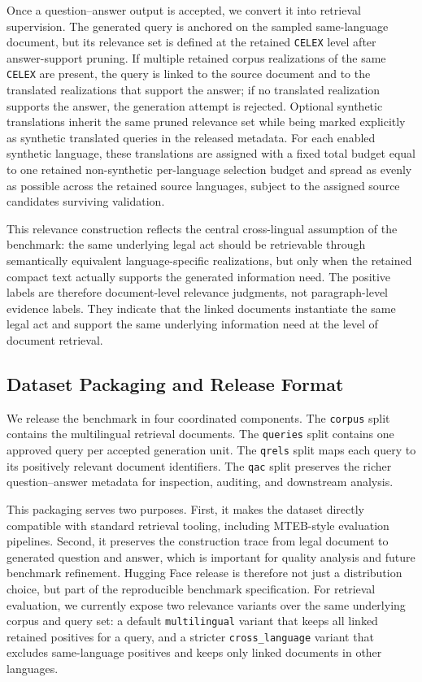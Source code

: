 Once a question--answer output is accepted, we convert it into retrieval supervision. The generated query is anchored on the sampled same-language document, but its relevance set is defined at the retained \texttt{CELEX} level after answer-support pruning. If multiple retained corpus realizations of the same \texttt{CELEX} are present, the query is linked to the source document and to the translated realizations that support the answer; if no translated realization supports the answer, the generation attempt is rejected. Optional synthetic translations inherit the same pruned relevance set while being marked explicitly as synthetic translated queries in the released metadata. For each enabled synthetic language, these translations are assigned with a fixed total budget equal to one retained non-synthetic per-language selection budget and spread as evenly as possible across the retained source languages, subject to the assigned source candidates surviving validation.

This relevance construction reflects the central cross-lingual assumption of the benchmark: the same underlying legal act should be retrievable through semantically equivalent language-specific realizations, but only when the retained compact text actually supports the generated information need. The positive labels are therefore document-level relevance judgments, not paragraph-level evidence labels. They indicate that the linked documents instantiate the same legal act and support the same underlying information need at the level of document retrieval.

\subsection{Dataset Packaging and Release Format}

We release the benchmark in four coordinated components. The \texttt{corpus} split contains the multilingual retrieval documents. The \texttt{queries} split contains one approved query per accepted generation unit. The \texttt{qrels} split maps each query to its positively relevant document identifiers. The \texttt{qac} split preserves the richer question--answer metadata for inspection, auditing, and downstream analysis.

This packaging serves two purposes. First, it makes the dataset directly compatible with standard retrieval tooling, including MTEB-style evaluation pipelines. Second, it preserves the construction trace from legal document to generated question and answer, which is important for quality analysis and future benchmark refinement. Hugging Face release is therefore not just a distribution choice, but part of the reproducible benchmark specification. For retrieval evaluation, we currently expose two relevance variants over the same underlying corpus and query set: a default \texttt{multilingual} variant that keeps all linked retained positives for a query, and a stricter \texttt{cross\_language} variant that excludes same-language positives and keeps only linked documents in other languages.

